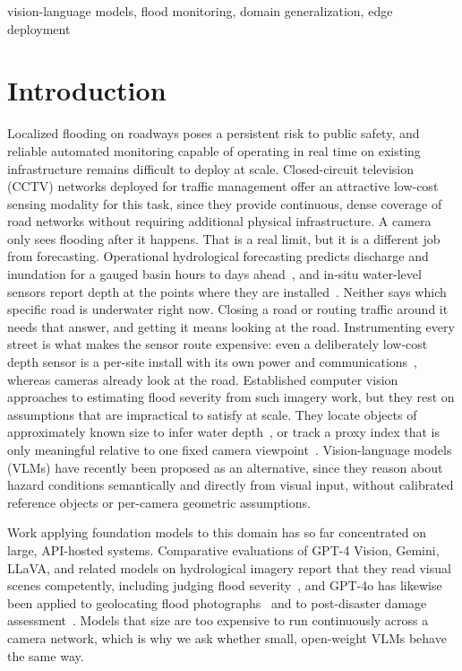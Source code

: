 \documentclass[conference]{IEEEtran}
\begin{document}
\begin{IEEEkeywords}
vision-language models, flood monitoring, domain generalization, edge deployment
\end{IEEEkeywords}

\section{Introduction}

Localized flooding on roadways poses a persistent risk to public safety, and reliable automated monitoring capable of operating in real time on existing infrastructure remains difficult to deploy at scale. Closed-circuit television (CCTV) networks deployed for traffic management offer an attractive low-cost sensing modality for this task, since they provide continuous, dense coverage of road networks without requiring additional physical infrastructure. A camera only sees flooding after it happens. That is a real limit, but it is a different job from forecasting. Operational hydrological forecasting predicts discharge and inundation for a gauged basin hours to days ahead~\cite{nevo2022flood}, and in-situ water-level sensors report depth at the points where they are installed~\cite{shi2021lowcost}. Neither says which specific road is underwater right now. Closing a road or routing traffic around it needs that answer, and getting it means looking at the road. Instrumenting every street is what makes the sensor route expensive: even a deliberately low-cost depth sensor is a per-site install with its own power and communications~\cite{shi2021lowcost}, whereas cameras already look at the road. Established computer vision approaches to estimating flood severity from such imagery work, but they rest on assumptions that are impractical to satisfy at scale. They locate objects of approximately known size to infer water depth~\cite{chaudhary2020water}, or track a proxy index that is only meaningful relative to one fixed camera viewpoint~\cite{moydevitry2019scalable}. Vision-language models (VLMs) have recently been proposed as an alternative, since they reason about hazard conditions semantically and directly from visual input, without calibrated reference objects or per-camera geometric assumptions.

Work applying foundation models to this domain has so far concentrated on large, API-hosted systems. Comparative evaluations of GPT-4 Vision, Gemini, LLaVA, and related models on hydrological imagery report that they read visual scenes competently, including judging flood severity~\cite{kadiyala2024mllm}, and GPT-4o has likewise been applied to geolocating flood photographs~\cite{schmidt2025geocoding} and to post-disaster damage assessment~\cite{chen2026lvlm}. Models that size are too expensive to run continuously across a camera network, which is why we ask whether small, open-weight VLMs behave the same way.
\end{document}
